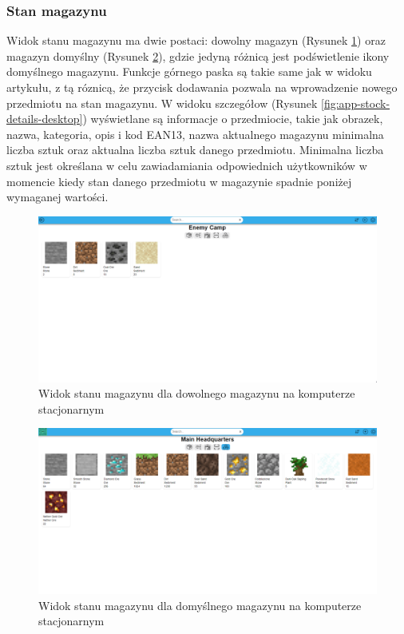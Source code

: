 \documentclass[../main.tex]{subfiles}
\begin{document}
        \FloatBarrier 
        \subsubsection{Stan magazynu}
            Widok stanu magazynu ma dwie postaci: dowolny magazyn (Rysunek \ref{fig:app-stock-any-desktop}) oraz magazyn domyślny (Rysunek \ref{fig:app-stock-default-desktop}), gdzie jedyną różnicą jest podświetlenie ikony domyślnego magazynu. Funkcje górnego paska są takie same jak w widoku artykułu, z tą róznicą, że przycisk dodawania pozwala na wprowadzenie nowego przedmiotu na stan magazynu. W widoku szczegółow (Rysunek \ref{fig:app-stock-details-desktop}) wyświetlane są informacje o przedmiocie, takie jak obrazek, nazwa, kategoria, opis i kod EAN13, nazwa aktualnego magazynu minimalna liczba sztuk oraz aktualna liczba sztuk danego przedmiotu. Minimalna liczba sztuk jest określana w celu zawiadamiania odpowiednich użytkowników w momencie kiedy stan danego przedmiotu w magazynie spadnie poniżej wymaganej wartości.

            \begin{figure}[H]
                \centering
                \includegraphics[width=\getImageWidth]{images/app-desktop/app-stock-any-desktop.png}
                \caption{Widok stanu magazynu dla dowolnego magazynu na komputerze stacjonarnym}
                \label{fig:app-stock-any-desktop}
            \end{figure}
            \begin{figure}[H]
                \centering
                \includegraphics[width=\getImageWidth]{images/app-desktop/app-stock-default-desktop.png}
                \caption{Widok stanu magazynu dla domyślnego magazynu na komputerze stacjonarnym}
                \label{fig:app-stock-default-desktop}
            \end{figure}
            
\end{document}
